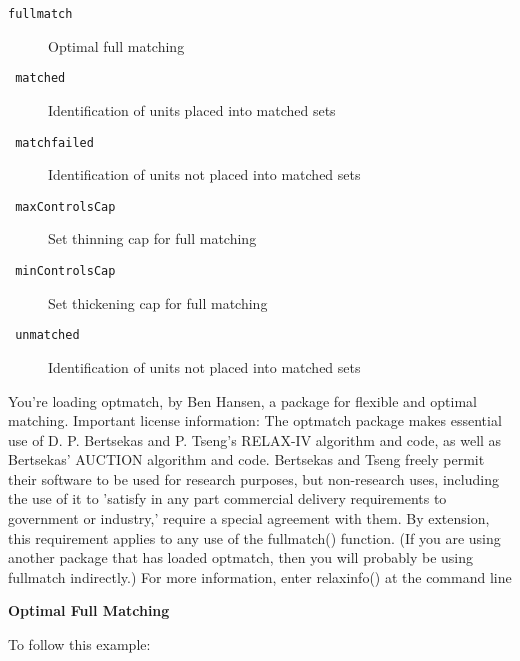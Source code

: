 \documentclass[12pt,twoside]{article}
\begin{document}
\bigskip
\begin{description}
\item[\texttt{fullmatch}]  \textrm{Optimal full matching}
\item[\texttt{
matched}]   \textrm{Identification of units placed into matched sets}
\item[\texttt{
matchfailed}]  \textrm{Identification of units not placed into matched
sets }
\item[\texttt{
maxControlsCap}]  \textrm{Set thinning cap for full matching}
\item[\texttt{
minControlsCap}]  \textrm{Set thickening cap for full matching}
\item[\texttt{
unmatched}]  \textrm{Identification of units not placed into matched
sets}
\end{description}

\bigskip

\begin{Schunk}
\begin{Soutput}
You're loading optmatch, by Ben Hansen, a package for flexible
 and optimal matching.  Important license information:
 The optmatch package makes essential use of D. P. Bertsekas
 and P. Tseng's RELAX-IV algorithm and code, as well as
 Bertsekas' AUCTION algorithm and code.
 Bertsekas and Tseng freely permit their software to be used for
 research purposes, but non-research uses, including the use of it
 to 'satisfy in any part commercial delivery requirements to
 government or industry,' require a special agreement with them.
 By extension, this requirement applies to any use of the 
 fullmatch() function. (If you are using another package that has
 loaded optmatch, then you will probably be using fullmatch indirectly.)
 For more information, enter relaxinfo() at the command line
\end{Soutput}
\end{Schunk}

{\rmfamily\bfseries
Optimal Full Matching}


\bigskip

{\ttfamily
\textrm{To follow this example:}}


\bigskip
\end{document}
